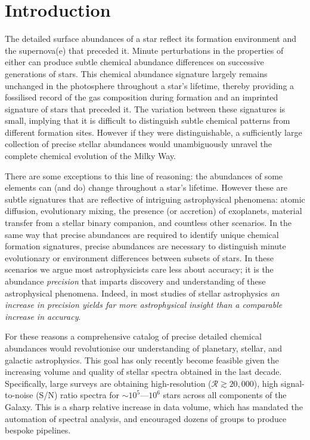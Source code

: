 \documentclass[12pt,preprint]{aastex}
\begin{document}
\section{Introduction}
The detailed surface abundances of a star reflect its formation environment
and the supernova(e) that preceded it.  Minute perturbations in the properties
of either can produce subtle chemical abundance differences on successive
generations of stars.  This chemical abundance signature largely remains 
unchanged in the photosphere throughout a star's lifetime, thereby 
providing a fossilised record of the gas composition during formation and an 
imprinted signature of stars that preceded it.  The variation between these
signatures is small, implying that it is difficult to distinguish subtle 
chemical patterns from different formation sites.  However if they were 
distinguishable, a sufficiently large collection of precise stellar abundances would 
unambiguously unravel the complete chemical evolution of the Milky Way.


There are some exceptions to this line of reasoning: the abundances of some
elements can (and do) change throughout a star's lifetime.  However these are
subtle signatures that are reflective of intriguing astrophysical phenomena:
atomic diffusion, evolutionary mixing, the presence (or accretion) of 
exoplanets, material transfer from a stellar binary companion, and countless
other scenarios.  In the same way that precise abundances are required to 
identify unique chemical formation signatures, precise abundances are necessary
to distinguish minute evolutionary or environment differences between subsets of
stars.  In these scenarios we argue most astrophysicists care less about
accuracy; it is the abundance \emph{precision} that imparts discovery and understanding
of these astrophysical phenomena.  Indeed, in most studies of stellar
astrophysics \textit{an increase in precision yields far more astrophysical 
insight than a comparable increase in accuracy}.


For these reasons a comprehensive catalog of precise detailed chemical
abundances would revolutionise our understanding of planetary, stellar, and 
galactic astrophysics.  This goal has only recently become feasible given the 
increasing volume and quality of stellar spectra obtained in the last decade.  
Specifically, large surveys are obtaining high-resolution 
($\mathcal{R} \gtrsim 20,000$), high signal-to-noise (S/N) ratio spectra for
$\sim10^5$---$10^6$ stars across all components of the Galaxy.  This is a
sharp relative increase in data volume, which has mandated the automation
of spectral analysis, and encouraged dozens of groups to produce bespoke
pipelines.
\end{document}
